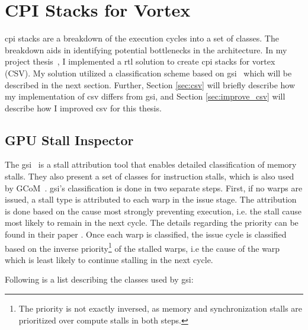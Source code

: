 \chapter{CPI Stacks for Vortex}

\Acrfull{cpi} stacks are a breakdown of the execution cycles into a set of classes. The breakdown aids in identifying potential bottlenecks in the architecture. In my project thesis~\cite{Aurud_Project}, I implemented a \acrfull{rtl} solution to create \acrshort{cpi} stacks for \Gls{vortex} (CSV). My solution utilized a classification scheme based on \acrshort{gsi}~\cite{GSI_GPU_Stall_Inspector} which will be described in the next section. Further, Section \ref{sec:csv} will briefly describe how my implementation of \acrshort{csv} differs from \acrshort{gsi}, and Section \ref{sec:improve_csv} will describe how I improved \acrshort{csv} for this thesis.

\section{GPU Stall Inspector} \label{sec:gsi}

The \acrfull{gsi}~\cite{GSI_GPU_Stall_Inspector} is a stall attribution tool that enables detailed classification of memory stalls. They also present a set of classes for instruction stalls, which is also used by GCoM~\cite{gcom}. \acrshort{gsi}'s classification is done in two separate steps. First, if no warps are issued, a stall type is attributed to each warp in the issue stage. The attribution is done based on the cause most strongly preventing execution, i.e. the stall cause most likely to remain in the next cycle. The details regarding the priority can be found in their paper \cite{GSI_GPU_Stall_Inspector}. Once each warp is classified, the issue cycle is classified based on the inverse priority\footnote{The priority is not exactly inversed, as memory and synchronization stalls are prioritized over compute stalls in
both steps.} of the stalled warps, i.e the cause of the warp which is least likely to continue stalling in the next cycle.

\vspace{1mm}\noindent
Following is a list describing the classes used by \acrshort{gsi}:

